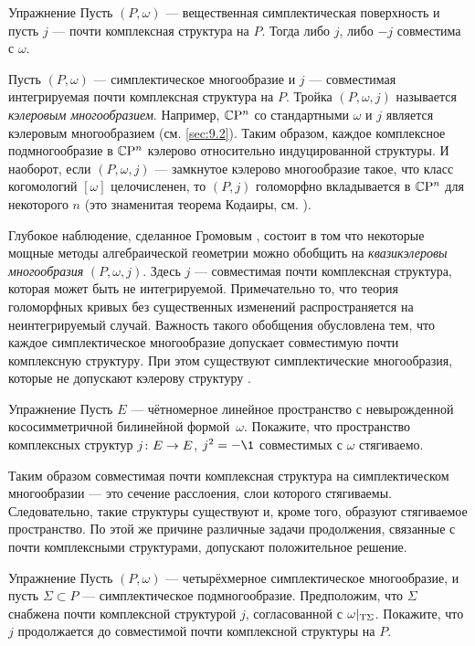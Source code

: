 \begin{ex}{Упражнение}\label{10.2.A}
Пусть $(P, \omega)$ — вещественная симплектическая
поверхность и пусть $j$ — почти комплексная структура на $P$. 
Тогда либо $j$, либо $-j$ совместима с $\omega$.
\end{ex}

Пусть $(P, \omega)$ — симплектическое многообразие и $j$ —
совместимая интегрируемая почти комплексная структура на $P$.
Тройка $(P, \omega, j)$ называется \emph{кэлеровым многообразием}.  
Например, $\mathbb{C}\mathrm{P}^n$ со стандартными $\omega$ и $j$ является кэлеровым
многообразием (см. \ref{sec:9.2}). 
Таким образом, каждое комплексное подмногообразие в $\mathbb{C}\mathrm{P}^n$ кэлерово
относительно индуцированной структуры. 
И наоборот, если $(P, \omega, j)$ — замкнутое кэлерово многообразие
такое, что класс когомологий $[\omega]$ целочисленен, то $(P, j)$
голоморфно вкладывается в $\mathbb{C}\mathrm{P}^n$ для некоторого $n$ (это знаменитая
теорема Кодаиры, см. \cite{GH}). 

Глубокое наблюдение, сделанное Громовым \cite{G1}, состоит в том
что некоторые мощные методы алгебраической геометрии можно обобщить на
\emph{квазикэлеровы многообразия}
$(P, \omega, j)$. 
Здесь $j$ — совместимая почти комплексная структура, которая может
быть не интегрируемой. 
Примечательно то, что теория голоморфных кривых без существенных
изменений распространяется на неинтегрируемый случай. 
Важность такого обобщения обусловлена тем, что
каждое симплектическое многообразие допускает совместимую почти комплексную структуру.
При этом существуют симплектические многообразия, которые не допускают кэлерову структуру \cite{MS}.

\begin{ex}[\cite{MS}]{Упражнение}\label{10.2.B}
Пусть $E$ — чётномерное линейное пространство с невырожденной
кососимметричной билинейной формой~$\omega$. 
Покажите, что пространство комплексных структур $j\: E \z\to E$, $j^2
= -\1$ совместимых с $\omega$ стягиваемо. 
\end{ex}

Таким образом совместимая почти комплексная структура на
симплектическом многообразии — это сечение расслоения, слои которого
стягиваемы. 
Следовательно, такие структуры существуют и, кроме того, образуют
стягиваемое пространство. 
По этой же причине различные задачи продолжения, связанные с почти
комплексными структурами, допускают положительное решение. 

\begin{ex}{Упражнение}\label{10.2.C}
Пусть $(P, \omega)$ — четырёхмерное симплектическое многообразие, и
пусть $\Sigma \subset P$ — симплектическое подмногообразие. 
Предположим, что $\Sigma$ снабжена почти комплексной структурой $j$,
согласованной с $\omega|_{\mathrm{T} \Sigma}$. 
Покажите, что $j$ продолжается до совместимой почти комплексной
структуры на $P$. 
\end{ex}


